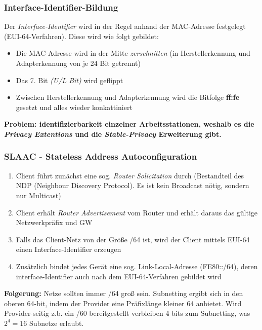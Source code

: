 \documentclass[a4paper, 12pt]{report}
\begin{document}
\begin{multicols}{2}
\subsubsection{Interface-Identifier-Bildung}

Der \emph{Interface-Identifier} wird in der Regel anhand der MAC-Adresse
festgelegt (EUI-64-Verfahren). Diese wird wie folgt gebildet:

\begin{itemize}
	\item Die MAC-Adresse wird in der Mitte \emph{zerschnitten} (in
		Herstellerkennung und Adapterkennung von je 24 Bit getrennt)
	\item Das 7. Bit \emph{(U/L Bit)} wird geflippt
	\item Zwischen Herstellerkennung und Adapterkennung wird die Bitfolge
		\textbf{ff:fe} gesetzt und alles wieder konkattiniert
\end{itemize}

\noindent \textbf{Problem: identifizierbarkeit einzelner Arbeitsstationen,
weshalb es die \emph{Privacy Extentions} und die \emph{Stable-Privacy}
Erweiterung gibt.}

\subsubsection{SLAAC - Stateless Address Autoconfiguration}

\begin{enumerate}
	\item Client führt zunächst eine sog. \emph{Router Solicitation} durch
		(Bestandteil des NDP (Neighbour Discovery Protocol). Es ist kein
		Broadcast nötig, sondern nur Multicast)
	\item Client erhält \emph{Router Advertisement} vom Router und erhält
		daraus das gültige Netzwerkpräfix und GW
	\item Falls das Client-Netz von der Größe /64 ist, wird der Client
		mittels EUI-64 einen Interface-Identifier erzeugen
	\item Zusätzlich bindet jedes Gerät eine sog. Link-Local-Adresse
		(FE80::/64), deren interface-Identifier auch nach dem
		EUI-64-Verfahren gebildet wird
\end{enumerate}

\textbf{Folgerung:} Netze sollten immer /64 groß sein. Subnetting ergibt sich in
den oberen 64-bit, indem der Provider eine Präfixlänge kleiner 64 anbietet. Wird
Provider-seitig z.b. ein /60 bereitgestellt verbleiben 4 bits zum Subnetting,
was $2^{4} = 16$ Subnetze erlaubt.

\end{multicols}
\end{document}
